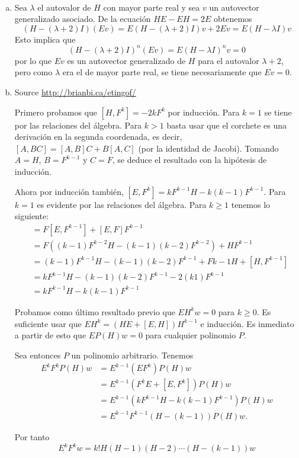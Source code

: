 \documentclass[twoside]{article}
\begin{document}
\begin{solucion}\
\begin{enumerate}[(a)]
\item Sea $\lambda$ el autovalor de $H$ con mayor parte real y sea $v$ un autovector generalizado asociado. De la ecuación $HE-EH=2E$ obtenemos 
\[
(H - (\lambda + 2)I)(Ev) = E(H - (\lambda + 2)I)v + 2Ev = E(H - \lambda I)v
\]
Esto implica que 
\[
(H - (\lambda + 2)I)^n (Ev) = E(H - \lambda I)^n v=0
\]
por lo que $Ev$ es un autovector generalizado de $H$ para el autovalor $\lambda+2$, pero como $\lambda$ era el de mayor parte real, se tiene necesariamente que $Ev=0$. 

\item Source \url{http://brianbi.ca/etingof/}

Primero probamos que $[H,F^k]=-2kF^k$ por inducción. Para $k=1$ se tiene por las relaciones del álgebra. Para $k>1$ basta usar que el corchete es una derivación en la segunda coordenada, es decir, $[A,BC]=[A,B]C+B[A,C]$ (por la identidad de Jacobi). Tomando $A=H$, $B=F^{k-1}$ y $C=F$, se deduce el resultado con la hipótesis de inducción. 

Ahora por inducción también, $[E,F^k]=kF^{k-1}H-k(k-1)F^{k-1}$. Para $k=1$ es evidente por las relaciones del álgebra. Para $k\geq 1$ tenemos lo siguiente:
\begin{align*}
[E,F^k]&=F[E,F^{k-1}]+[E,F]F^{k-1}\\
&=F((k-1)F^{k-2}H-(k-1)(k-2)F^{k-2})+HF^{k-1}\\
&=(k-1)F^{k-1}H-(k-1)(k-2)F^{k-1}+F{k-1}H+[H,F^{k-1}]\\
&=kF^{k-1}H-(k-1)(k-2)F^{k-1}-2(k1)F^{k-1}\\
&=kF^{k-1}H-k(k-1)F^{k-1}
\end{align*}

Probamos como último resultado previo que $EH^kw=0$ para $k\geq 0$. Es suficiente usar que $EH^k=(HE+[E,H])H^{k-1}$ e inducción. Es inmediato a partir de esto que $EP(H)w=0$ para cualquier polinomio $P$. 

Sea entonces $P$ un polinomio arbitrario. Tenemos
\begin{align*}
E^kF^kP(H)w&=E^{k-1}(EF^k)P(H)w\\
&=E^{k-1}(F^kE+[E,F^k])P(H)w\\
&=E^{k-1}(kF^{k-1}H-k(k-1)F^{k-1})P(H)w\\
&=E^{k-1}F^{k-1}(H-(k-1))P(H)w.
\end{align*}

Por tanto
\[
E^kF^kw=k!H(H-1)(H-2)\cdots (H-(k-1))w
\]


\end{enumerate}
\end{solucion}
\end{document}
